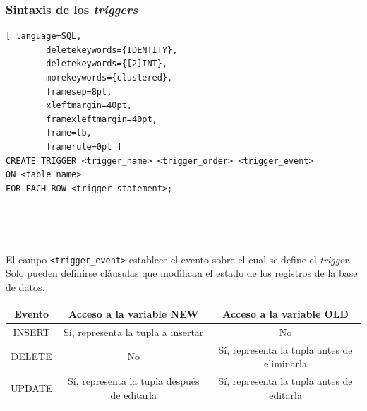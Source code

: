 \documentclass[
	10pt, %
	aspectratio=169, %
]{beamer}
\begin{document}
\begin{frame}[fragile]
	
	\frametitle{Sintaxis de los \emph{triggers}}
	
	\begin{lstlisting}[ language=SQL,
		deletekeywords={IDENTITY},
		deletekeywords={[2]INT},
		morekeywords={clustered},
		framesep=8pt,
		xleftmargin=40pt,
		framexleftmargin=40pt,
		frame=tb,
		framerule=0pt ]
CREATE TRIGGER <trigger_name> <trigger_order> <trigger_event> 
ON <table_name> 
FOR EACH ROW <trigger_statement>;
\end{lstlisting}
	
	\ 
	
	\ 
	
	\pause
	
	El campo \texttt{<trigger\_event>} establece el evento sobre el cual se define el \emph{trigger}. Solo pueden definirse cláusulas que modifican el estado de los registros de la base de datos. 
	
	\pause
	
	\begin{table}[]
		\begin{tabular}{| c | c | c |}
			\hline
			Evento & Acceso a la variable \textcolor{codepurple}{NEW} & Acceso a la variable \textcolor{codepurple}{OLD} \\ \hline \hline
			\textcolor{codepurple}{INSERT} & Sí, representa la tupla a insertar & No \\ \hline
			\textcolor{codepurple}{DELETE} & No & Sí, representa la tupla antes de eliminarla \\ \hline
			\textcolor{codepurple}{UPDATE} & Sí, representa la tupla después de editarla & Sí, representa la tupla antes de editarla \\ \hline
		\end{tabular}
	\end{table}
	
\end{frame}

\end{document}
